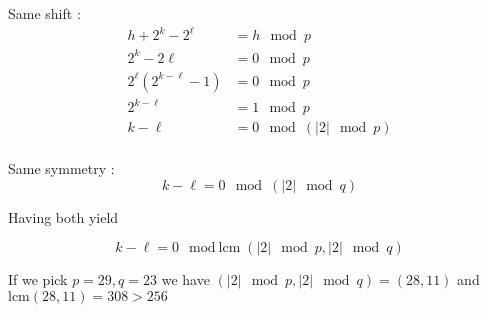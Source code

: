 \documentclass{article}
\begin{document}
Same shift : 
\begin{align*}
	h + 2^k - 2^\ell &= h \mod p \\
	2^k - 2\ell &= 0 \mod p\\
	2^\ell( 2^{k-\ell} - 1) &= 0 \mod p\\
 	2^{k-\ell} &= 1 \mod p\\
	k - \ell &= 0 \mod (|2| \mod p)\\
\end{align*}

Same symmetry :
$$k - \ell = 0 \mod (|2| \mod q)$$

Having both yield

$$k - \ell = 0 \mod \text{lcm}(|2| \mod p,|2| \mod q)$$

If we pick $p = 29, q = 23$ we have $(|2| \mod p,|2| \mod q) = (28, 11)$ and $\text{lcm}(28,11) = 308 > 256$

\end{document}
